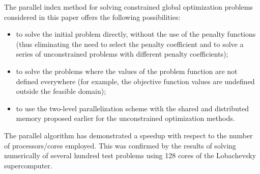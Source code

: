 \documentclass[smallextended]{svjour3}       %
\begin{document}
The parallel index method for solving constrained global optimization problems considered in this paper offers the following possibilities:
\begin{itemize}
	\item to solve the initial problem directly, without the use of the penalty functions (thus eliminating the need to select the penalty coefficient and to solve a series of unconstrained problems with different penalty coefficients);
	\item to solve the problems where the values of the problem function are not defined everywhere (for example, the objective function values are undefined outside the feasible domain);
	\item to use the two-level parallelization scheme with the shared and distributed memory proposed earlier for the unconstrained optimization methods.
\end{itemize}

The parallel algorithm has demonstrated a speedup with respect to the number of processors/cores employed. This was confirmed by the results of solving numerically of several hundred test problems using 128 cores of the Lobachevsky supercomputer. 
\end{document}
